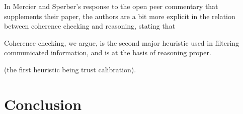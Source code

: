 In Mercier and Sperber's response to the open peer commentary that supplements their paper, the authors are a bit more explicit in the relation between coherence checking and reasoning, stating that
\begin{quoting}
    Coherence checking, we argue, is the second major heuristic used in filtering communicated information, and is at the basis of reasoning proper.
    \hfill \citep[p.~96]{MS11}
\end{quoting}
(the first heuristic being trust calibration).

\section{Conclusion}

